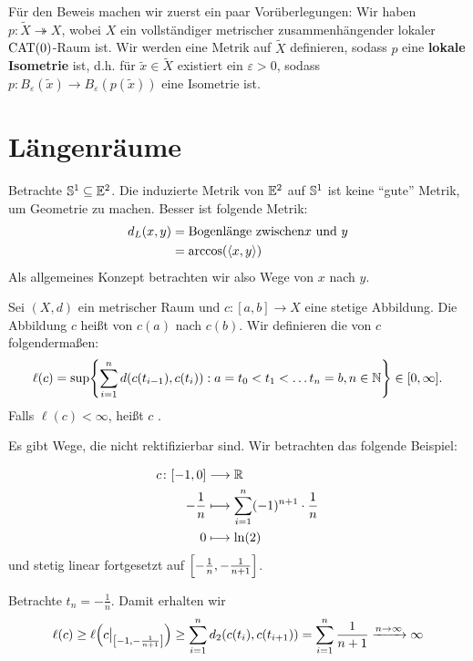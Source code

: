 Für den Beweis machen wir zuerst ein paar Vorüberlegungen: Wir haben $p \colon \tilde{X} \twoheadrightarrow X$, wobei $X$ ein vollständiger metrischer zusammenhängender lokaler $\CAT$-Raum ist. Wir werden eine Metrik auf $\tilde{X}$ definieren, sodass $p$ eine \textbf{lokale Isometrie} ist, d.h. für $\tilde{x} \in \tilde{X}$ existiert ein $\varepsilon > 0$, sodass $p \colon B_\varepsilon(\tilde{x}) \rightarrow B_\varepsilon(p(\tilde{x}))$ eine Isometrie ist.

\section{Längenräume}
\label{sec:2.1}
	Betrachte $\Ss^1 \subseteq \EE^2$. Die induzierte Metrik von $\EE^2$ auf $\Ss^1$ ist keine \enquote{gute} Metrik, um Geometrie zu machen. Besser ist folgende Metrik:
	\begin{align*}
		d_L(x,y) &= \text{Bogenlänge zwischen} x \text{ und } y \\
		&= \arccos(\sprod{x,y})
	\end{align*}
	Als allgemeines Konzept betrachten wir also Wege von $x$ nach $y$.
	
\begin{definition}
\label{def:2.3}
	Sei $(X,d)$ ein metrischer Raum und $c\colon [a,b] \rightarrow X$ eine stetige Abbildung.
	Die Abbildung $c$ heißt  von $c(a)$ nach $c(b)$.
	Wir definieren die  von $c$ folgendermaßen:
	\[
		\ell(c) = \sup \penbrace*{ \sum\limits_{i=1}^{n} d(c(t_{i-1}),c(t_i)) : a=t_0 < t_1 < \dots t_n = b, n\in \NN} \in [0,\infty].
	\]
	Falls $\ell(c) < \infty$, heißt $c$ . 
\end{definition}

\begin{bemerkung}
\label{bem:2.4}
	Es gibt Wege, die nicht rektifizierbar sind.
	Wir betrachten das folgende Beispiel:
	
	\begin{align*}
		c \colon [-1,0] &\longrightarrow \RR \\
		-\frac{1}{n} &\longmapsto \sum_{i=1}^{n} (-1)^{n+1} \cdot \frac{1}{n} \\
		0 &\longmapsto \ln(2)
	\end{align*}
	und stetig linear fortgesetzt auf $\benbrace*{-\frac{1}{n}, -\frac{1}{n+1}}$. 

	Betrachte $t_n = -\frac{1}{n}$. Damit erhalten wir
	\[
		\ell(c) \geq \ell \enbrace*{c \big|_{\benbrace*{-1,-\frac{1}{n+1}}}} \geq \sum\limits_{i=1}^{n} d_2(c(t_i),c(t_{i+1})) = \sum\limits_{i=1}^{n} \frac{1}{n+1} \xrightarrow{n \rightarrow \infty} \infty
	\]
\end{bemerkung}

